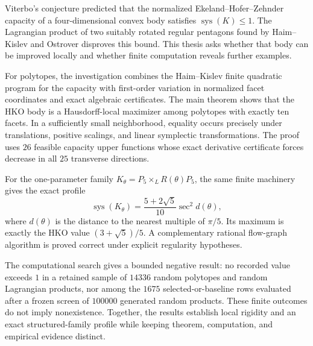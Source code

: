 Viterbo's conjecture predicted that the normalized
Ekeland--Hofer--Zehnder capacity of a four-dimensional convex body satisfies
\(\operatorname{sys}(K)\leq 1\).  The Lagrangian product of two suitably
rotated regular pentagons found by Haim--Kislev and Ostrover disproves this
bound.  This thesis asks whether that body can be improved locally and whether
finite computation reveals further examples.

For polytopes, the investigation combines the Haim--Kislev finite quadratic
program for the capacity with first-order variation in normalized facet
coordinates and exact algebraic certificates.  The main theorem shows that
the HKO body is a Hausdorff-local maximizer among polytopes with exactly ten
facets.  In a sufficiently small neighborhood, equality occurs precisely
under translations, positive scalings, and linear symplectic transformations.
The proof uses \(26\) feasible capacity upper functions whose exact derivative
certificate forces decrease in all \(25\) transverse directions.

For the one-parameter family
\(K_\theta=P_5\times_L R(\theta)P_5\), the same finite machinery gives the
exact profile
\[
  \operatorname{sys}(K_\theta)
  =\frac{5+2\sqrt5}{10}\sec^2 d(\theta),
\]
where \(d(\theta)\) is the distance to the nearest multiple of \(\pi/5\).
Its maximum is exactly the HKO value \((3+\sqrt5)/5\).  A complementary
rational flow-graph algorithm is proved correct under explicit regularity
hypotheses.

The computational search gives a bounded negative result: no recorded value
exceeds \(1\) in a retained sample of \(14336\) random polytopes and random
Lagrangian products, nor among the \(1675\) selected-or-baseline rows evaluated
after a frozen screen of \(100000\) generated random products.  These finite
outcomes do not imply nonexistence.  Together, the results establish local
rigidity and an exact structured-family profile while keeping theorem,
computation, and empirical evidence distinct.
